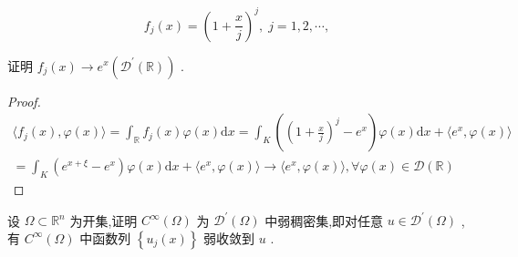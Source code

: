 \documentclass[lang=cn,newtx,10pt,scheme=chinese,thmcnt=chapter]{elegantbook}
\newcommand{\dif}{\mathrm{d}}
\begin{document}
\begin{problemset}
\begin{equation*}
{f}_{j}\left( x\right)  = {\left( 1 + \frac{x}{j}\right) }^{j},\;j = 1,2,\cdots ,
\end{equation*}

证明 \({f}_{j}\left( x\right)  \rightarrow  {e}^{x}\left( {{\mathcal{D}}^{\prime }\left( \mathbb{R}\right) }\right)\) .
\begin{proof}      \begin{equation*}
    \begin{aligned}
        \langle f_j(x),\varphi(x)\rangle=\int_\mathbb{R}f_j(x)\varphi(x)\dif x=\int_K\left(\left(1+\frac{x}{j}\right)^j-e^x\right)\varphi(x)\dif x+\langle e^x,\varphi(x)\rangle\\=\int_K\left(e^{x+\xi}-e^x\right)\varphi(x)\dif x+\langle e^x,\varphi(x)\rangle\to\langle e^x,\varphi(x)\rangle,\forall \varphi(x)\in \mathcal{D}(\mathbb{R})
    \end{aligned}
\end{equation*}
    
\end{proof}
\item 设 \(\Omega  \subset  {\mathbb{R}}^{n}\) 为开集,证明 \({C}^{\infty }\left( \Omega \right)\) 为 \({\mathcal{D}}^{\prime }\left( \Omega \right)\) 中弱稠密集,即对任意 \(u \in  {\mathcal{D}}^{\prime }\left( \Omega \right)\) , 有 \({C}^{\infty }\left( \Omega \right)\) 中函数列 \(\left\{  {{u}_{j}\left( x\right) }\right\}\) 弱收敛到 \(u\) .


\end{problemset}
\end{document}
